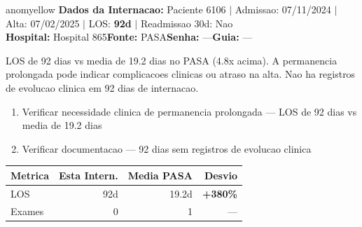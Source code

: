 \documentclass[a4paper,10pt]{article}
\begin{document}
\begin{anomalycard}[Internacao 149418 | PASA | MODERADO (z=2.32)]{anomyellow}
\textbf{Dados da Internacao:} Paciente 6106 $\mid$ Admissao: 07/11/2024 $\mid$ Alta: 07/02/2025 $\mid$ LOS: \textbf{92d} $\mid$ Readmissao 30d: Nao\\
\textbf{Hospital:} Hospital 865\quad\textbf{Fonte:} PASA\quad\textbf{Senha:} ---\quad\textbf{Guia:} ---\\
\vspace{2pt}\begin{tcolorbox}[colback=severityred!20,colframe=anomyellow,title={\textbf{Interpretacao de Negocio}},fonttitle=\bfseries\small,left=4pt,right=4pt,top=3pt,bottom=3pt]
{\small LOS de 92 dias vs media de 19.2 dias no PASA (4.8x acima). A permanencia prolongada pode indicar complicacoes clinicas ou atraso na alta. Nao ha registros de evolucao clinica em 92 dias de internacao.}
\end{tcolorbox}
\begin{tcolorbox}[colback=severityyellow!30,colframe=anomorange,title={\textbf{Recomendacoes Especificas}},fonttitle=\bfseries\small,left=4pt,right=4pt,top=3pt,bottom=3pt]
\begin{enumerate}[nosep,leftmargin=16pt]
\item {\small Verificar necessidade clinica de permanencia prolongada --- LOS de 92 dias vs media de 19.2 dias}
\item {\small Verificar documentacao --- 92 dias sem registros de evolucao clinica}
\end{enumerate}
\end{tcolorbox}
\begin{center}\begin{tabular}{l r r r}\toprule\textbf{Metrica} & \textbf{Esta Intern.} & \textbf{Media PASA} & \textbf{Desvio} \\\midrule
LOS & 92d & 19.2d & \textcolor{anomred}{\textbf{+380\%}} \\
Exames & 0 & 1 & --- \\
\bottomrule\end{tabular}\end{center}


\end{anomalycard}
\end{document}
